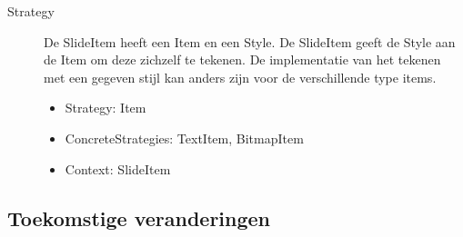\documentclass[a4paper]{article}
\begin{document}
\begin{description}
\item[Strategy] De SlideItem heeft een Item en een Style. De SlideItem geeft de Style aan de Item om deze zichzelf te tekenen. De implementatie van het tekenen met een gegeven stijl kan anders zijn voor de verschillende type items.
\begin{itemize}
\item Strategy: Item
\item ConcreteStrategies: TextItem, BitmapItem
\item Context: SlideItem
\end{itemize}

\end{description}
\subsection{Toekomstige veranderingen}
\end{document}
